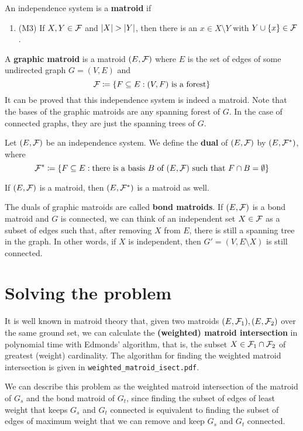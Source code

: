 \documentclass[english,12pt]{article}
\begin{document}
        \begin{definition}
            An independence system is a \textbf{matroid} if
            \begin{enumerate}
                \item (M3) If $X, Y \in \mathcal{F}$ and $\left|X\right| > \left|Y\right|$, then there is an $x \in X \setminus Y$ with $Y \cup \{x\} \in \mathcal{F}$.
            \end{enumerate}
        \end{definition}

        \begin{definition}
            A \textbf{graphic matroid} is a matroid $(E, \mathcal{F})$ where $E$ is the set of edges of some undirected graph $G = (V, E)$ and
            \[\mathcal{F} \coloneqq \{F \subseteq E : (V, F) \text{ is a forest}\}\]
            It can be proved that this independence system is indeed a matroid.
            Note that the bases of the graphic matroids are any spanning forest of $G$.
            In the case of connected graphs, they are just the spanning trees of $G$.
        \end{definition}

        \begin{definition}
            Let $(E, \mathcal{F})$ be an independence system. We define the \textbf{dual} of $(E, \mathcal{F})$ by $(E, \mathcal{F}^*)$, where
            \[\mathcal{F}^* \coloneqq \{F \subseteq E : \text{there is a basis } B \text { of } (E, \mathcal{F}) \text{ such that } F \cap B = \emptyset\}\]
        \end{definition}

        \begin{proposition}
            If $(E, \mathcal{F})$ is a matroid, then $(E, \mathcal{F}^*)$ is a matroid as well.
        \end{proposition}
        
        The duals of graphic matroids are called \textbf{bond matroids}.
        If $(E, \mathcal{F})$ is a bond matroid and $G$ is connected, we can think of an independent set $X \in \mathcal{F}$ as a subset of edges such that, after removing $X$ from $E$, there is still a spanning tree in the graph.
        In other words, if $X$ is independent, then $G' = (V, E \setminus X)$ is still connected.

    \section{Solving the problem}
        
        It is well known in matroid theory that, given two matroids $(E, \mathcal{F}_1), (E, \mathcal{F}_2)$ over the same ground set, we can calculate the \textbf{(weighted) matroid intersection} in polynomial time with Edmonds' algorithm, that is, the subset $X \in \mathcal{F}_1 \cap \mathcal{F}_2$ of greatest (weight) cardinality.
        The algorithm for finding the weighted matroid intersection is given in \verb*|weighted_matroid_isect.pdf|.

        We can describe this problem as the weighted matroid intersection of the matroid of $G_s$ and the bond matroid of $G_t$, since finding the subset of edges of least weight that keeps $G_s$ and $G_t$ connected is equivalent to finding the subset of edges of maximum weight that we can remove and keep $G_s$ and $G_t$ connected.
\end{document}
